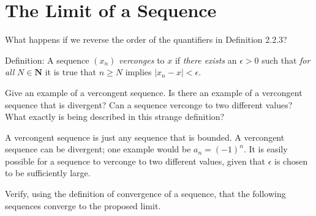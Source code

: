 \section{The Limit of a Sequence}

\begin{exercise}
What happens if we reverse the order of the quantifiers in Definition 2.2.3?

Definition: A sequence $\left(x_{n}\right)$ \emph{verconges} to $x$ if \emph{there exists} an $\epsilon>0$ such that \emph{for all} $N \in \mathbf{N}$ it is true that $n \geq N$ implies $\left|x_{n}-x\right|<\epsilon$.

Give an example of a vercongent sequence. Is there an example of a vercongent sequence that is divergent? Can a sequence verconge to two different values? What exactly is being described in this strange definition?
\end{exercise}

\begin{solution}
  A vercongent sequence is just any sequence that is bounded. A vercongent sequence can be divergent; one example would be $a_n = (-1)^n$. It is easily possible for a sequence to verconge to two different values, given that $\epsilon$ is chosen to be sufficiently large.
\end{solution}

\begin{exercise}
  Verify, using the definition of convergence of a sequence, that the following sequences converge to the proposed limit.
\end{exercise}

